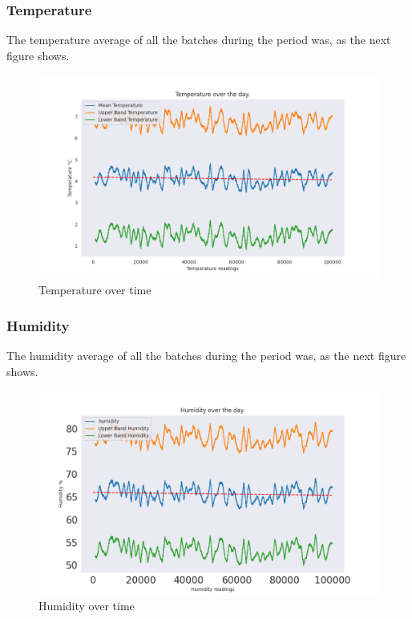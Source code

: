 \documentclass[daily]{engenius}
\begin{document}
\subsubsection{Temperature}

The temperature average of all the batches during the period was, as the next figure shows.

\begin{figure}[!ht]
    \begin{center}
        \includegraphics[width=\textwidth/2]{./temp/temperature_plot.png}
        \caption{Temperature over time}
        \label{img:engeniuslogo}
    \end{center}
\end{figure}


\subsubsection{Humidity}

The humidity average of all the batches during the period was, as the next figure shows.

\begin{figure}[!ht]
    \begin{center}
        \includegraphics[width=\textwidth/2]{./temp/humidity_plot.png}
        \caption{Humidity over time}
        \label{img:engeniuslogo}
    \end{center}
\end{figure}
\end{document}
